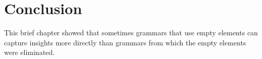 

\section{Conclusion}

This brief chapter showed that sometimes grammars that use empty elements can capture insights more
directly than grammars from which the empty elements were eliminated.


